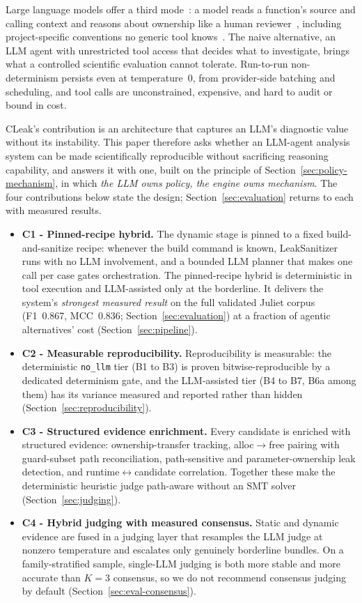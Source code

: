 \documentclass[a4paper]{llncs}
\begin{document}
Large language models offer a third mode~\cite{iris}: a model reads a
function's source and calling context and reasons about ownership like
a human reviewer~\cite{llm-vuln-eval}, including project-specific
conventions no generic tool knows~\cite{llm-proxy-static}. The naive
alternative, an LLM agent with unrestricted tool access that decides
what to investigate, brings what a controlled scientific evaluation
cannot tolerate. Run-to-run non-determinism persists even at
temperature~0, from provider-side batching and scheduling, and tool
calls are unconstrained, expensive, and hard to audit or bound in cost.

CLeak's contribution is an architecture that captures an LLM's
diagnostic value without its instability. This paper therefore asks
whether an LLM-agent analysis system can be made scientifically
reproducible without sacrificing reasoning capability, and answers it
with one, built on the principle of
Section~\ref{sec:policy-mechanism}, in which \emph{the LLM owns
policy, the engine owns mechanism}. The four contributions below
state the design; Section~\ref{sec:evaluation} returns to each with
measured results.

\label{sec:contributions}
\begin{itemize}
\item \textbf{C1 - Pinned-recipe hybrid.} The dynamic stage is pinned
to a fixed build-and-sanitize recipe: whenever the build command is
known, LeakSanitizer runs with no LLM involvement, and a bounded LLM
planner that makes one call per case gates orchestration. The
pinned-recipe hybrid is deterministic in tool execution and
LLM-assisted only at the borderline. It delivers the system's
\emph{strongest measured result} on the full validated Juliet corpus
(F1~0.867, MCC~0.836; Section~\ref{sec:evaluation}) at a fraction of
agentic alternatives' cost (Section~\ref{sec:pipeline}).
\item \textbf{C2 - Measurable reproducibility.} Reproducibility is
measurable: the deterministic \texttt{no\_llm} tier (B1 to B3) is
proven bitwise-reproducible by a dedicated determinism gate, and the
LLM-assisted tier (B4 to B7, B6a among them) has its variance measured
and reported rather than hidden (Section~\ref{sec:reproducibility}).
\item \textbf{C3 - Structured evidence enrichment.} Every candidate
is enriched with structured evidence: ownership-transfer tracking,
alloc$\to$free pairing with guard-subset path reconciliation,
path-sensitive and parameter-ownership leak detection, and
runtime$\leftrightarrow$candidate correlation. Together these make
the deterministic heuristic judge path-aware without an SMT solver
(Section~\ref{sec:judging}).
\item \textbf{C4 - Hybrid judging with measured consensus.} Static
and dynamic evidence are fused in a judging layer that resamples the
LLM judge at nonzero temperature and escalates only genuinely
borderline bundles. On a family-stratified sample, single-LLM judging
is both more stable and more accurate than $K{=}3$ consensus, so we do
not recommend consensus judging by default
(Section~\ref{sec:eval-consensus}).
\end{itemize}
\end{document}
